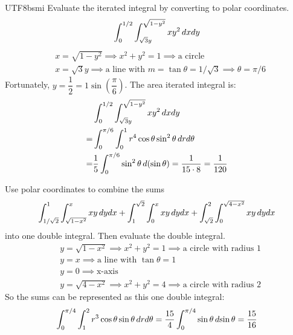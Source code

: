 \documentclass[12pt, a4paper]{article}
\begin{document}
\begin{CJK*}{UTF8}{bsmi}
Evaluate the iterated integral by converting to polar coordinates.
\begin{equation}
    \int_0^{1/2}\int_{\sqrt{3}y}^{\sqrt{1-y^2}}xy^2\,dx dy
\end{equation}
\begin{align}
    &x=\sqrt{1-y^2 } \implies x^2+y^2=1 \implies \text{a circle}\\
    &x=\sqrt{3}y \implies \text{a line with }m=\tan\theta=1/\sqrt{3} \implies \theta = \pi/6
\end{align}
Fortunately, $y=\dfrac{1}{2}=1\sin{(\dfrac{\pi}{6})}$. The area iterated integral is:
\begin{align}
    &\int_0^{1/2}\int_{\sqrt{3}y}^{\sqrt{1-y^2}}xy^2\,dx dy\\
    =&\int_0^{\pi/6}\int_0^1 r^4\cos\theta \sin^2\theta\,dr d\theta\\
    =&\dfrac{1}{5}\int_0^{\pi/6} \sin^2\theta \,d(\sin \theta)=\dfrac{1}{15\cdot 8}=\dfrac{1}{120}
\end{align}

Use polar coordinates to combine the sums
\begin{equation}
    \int_{1/\sqrt{2}}^{1}\int_{\sqrt{1-x^2}}^x xy\,dy dx + \int_1^{\sqrt{2}}\int_0^x xy\,dy dx+\int_{\sqrt{2}}^{2}\int_0^{\sqrt{4-x^2}}xy\,dy dx
\end{equation}
into one double integral. Then evaluate the double integral.
\begin{align}
    &y=\sqrt{1-x^2} \implies x^2+y^2 = 1 \implies \text{a circle with radius 1}\\
    &y=x \implies \text{a line with }\tan \theta = 1 \\
    &y=0 \implies \text{x-axis}\\
    &y=\sqrt{4-x^2} \implies x^2+y^2 = 4 \implies \text{a circle with radius 2}
\end{align}
So the sums can be represented as this one double integral:
\begin{equation}
    \int_0^{\pi/4}\int_1^2 r^3\cos\theta\sin\theta \,dr d\theta=\dfrac{15}{4}\int_0^{\pi/4}\sin\theta \,d{\sin\theta}=\dfrac{15}{16}
\end{equation}

\end{CJK*}
\end{document}
